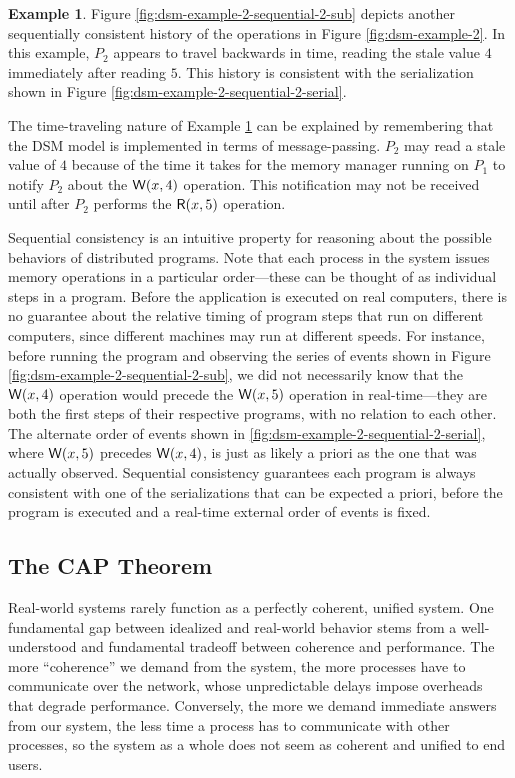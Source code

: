 \documentclass[]             %
{NASA}                       %
\theoremstyle{definition}
\newtheorem{example}[theorem]{Example}
\begin{document}
\begin{example}
  \label{ex:dsm-example-2-sequential-2}
  Figure \ref{fig:dsm-example-2-sequential-2-sub} depicts another
  sequentially consistent history of the operations in Figure
  \ref{fig:dsm-example-2}. In this example, $P_2$ appears to travel
  backwards in time, reading the stale value $4$ immediately after
  reading $5$. This history is consistent with the serialization
  shown in Figure \ref{fig:dsm-example-2-sequential-2-serial}.
\end{example}

The time-traveling nature of Example
\ref{ex:dsm-example-2-sequential-2} can be explained by remembering
that the DSM model is implemented in terms of message-passing. $P_2$
may read a stale value of $4$ because of the time it takes for the
memory manager running on $P_1$ to notify $P_2$ about the
$\mathsf{W}\!\left(x, 4\right)$ operation. This notification may not be received
until after $P_2$ performs the $\mathsf{R}\!\left(x, 5\right)$ operation.

Sequential consistency is an intuitive property for reasoning about
the possible behaviors of distributed programs. Note that each process
in the system issues memory operations in a particular order---these
can be thought of as individual steps in a program. Before the
application is executed on real computers, there is no guarantee about
the relative timing of program steps that run on different computers,
since different machines may run at different speeds. For instance,
before running the program and observing the series of events shown in
Figure \ref{fig:dsm-example-2-sequential-2-sub}, we did not
necessarily know that the $\mathsf{W}\!\left(x, 4\right)$ operation would precede
the $\mathsf{W}\!\left(x, 5\right)$ operation in real-time---they are both the first
steps of their respective programs, with no relation to each
other. The alternate order of events shown in
\ref{fig:dsm-example-2-sequential-2-serial}, where $\mathsf{W}\!\left(x, 5\right)$
precedes $\mathsf{W}\!\left(x, 4\right)$, is just as likely a priori as the one that
was actually observed. Sequential consistency guarantees each program
is always consistent with one of the serializations that can be
expected a priori, before the program is executed and a real-time
external order of events is fixed.

\subsection{The CAP Theorem}
Real-world systems rarely function as a perfectly coherent, unified
system. One fundamental gap between idealized and real-world behavior
stems from a well-understood and fundamental tradeoff between
coherence and performance. The more ``coherence'' we demand from the
system, the more processes have to communicate over the network, whose
unpredictable delays impose overheads that degrade
performance. Conversely, the more we demand immediate answers from our
system, the less time a process has to communicate with other
processes, so the system as a whole does not seem as coherent and
unified to end users.
\end{document}

